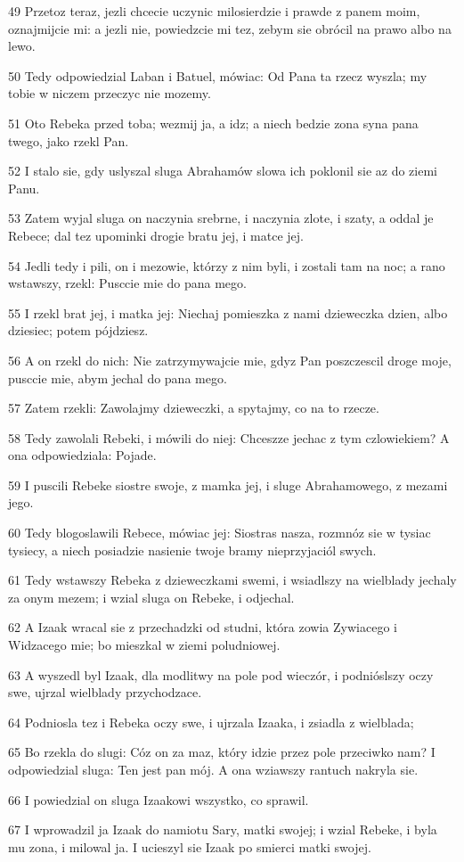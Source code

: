 \par 49 Przetoz teraz, jezli chcecie uczynic milosierdzie i prawde z panem moim, oznajmijcie mi: a jezli nie, powiedzcie mi tez, zebym sie obrócil na prawo albo na lewo.
\par 50 Tedy odpowiedzial Laban i Batuel, mówiac: Od Pana ta rzecz wyszla; my tobie w niczem przeczyc nie mozemy.
\par 51 Oto Rebeka przed toba; wezmij ja, a idz; a niech bedzie zona syna pana twego, jako rzekl Pan.
\par 52 I stalo sie, gdy uslyszal sluga Abrahamów slowa ich poklonil sie az do ziemi Panu.
\par 53 Zatem wyjal sluga on naczynia srebrne, i naczynia zlote, i szaty, a oddal je Rebece; dal tez upominki drogie bratu jej, i matce jej.
\par 54 Jedli tedy i pili, on i mezowie, którzy z nim byli, i zostali tam na noc; a rano wstawszy, rzekl: Pusccie mie do pana mego.
\par 55 I rzekl brat jej, i matka jej: Niechaj pomieszka z nami dzieweczka dzien, albo dziesiec; potem pójdziesz.
\par 56 A on rzekl do nich: Nie zatrzymywajcie mie, gdyz Pan poszczescil droge moje, pusccie mie, abym jechal do pana mego.
\par 57 Zatem rzekli: Zawolajmy dzieweczki, a spytajmy, co na to rzecze.
\par 58 Tedy zawolali Rebeki, i mówili do niej: Chceszze jechac z tym czlowiekiem? A ona odpowiedziala: Pojade.
\par 59 I puscili Rebeke siostre swoje, z mamka jej, i sluge Abrahamowego, z mezami jego.
\par 60 Tedy blogoslawili Rebece, mówiac jej: Siostras nasza, rozmnóz sie w tysiac tysiecy, a niech posiadzie nasienie twoje bramy nieprzyjaciól swych.
\par 61 Tedy wstawszy Rebeka z dzieweczkami swemi, i wsiadlszy na wielblady jechaly za onym mezem; i wzial sluga on Rebeke, i odjechal.
\par 62 A Izaak wracal sie z przechadzki od studni, która zowia Zywiacego i Widzacego mie; bo mieszkal w ziemi poludniowej.
\par 63 A wyszedl byl Izaak, dla modlitwy na pole pod wieczór, i podnióslszy oczy swe, ujrzal wielblady przychodzace.
\par 64 Podniosla tez i Rebeka oczy swe, i ujrzala Izaaka, i zsiadla z wielblada;
\par 65 Bo rzekla do slugi: Cóz on za maz, który idzie przez pole przeciwko nam? I odpowiedzial sluga: Ten jest pan mój. A ona wziawszy rantuch nakryla sie.
\par 66 I powiedzial on sluga Izaakowi wszystko, co sprawil.
\par 67 I wprowadzil ja Izaak do namiotu Sary, matki swojej; i wzial Rebeke, i byla mu zona, i milowal ja. I ucieszyl sie Izaak po smierci matki swojej.


